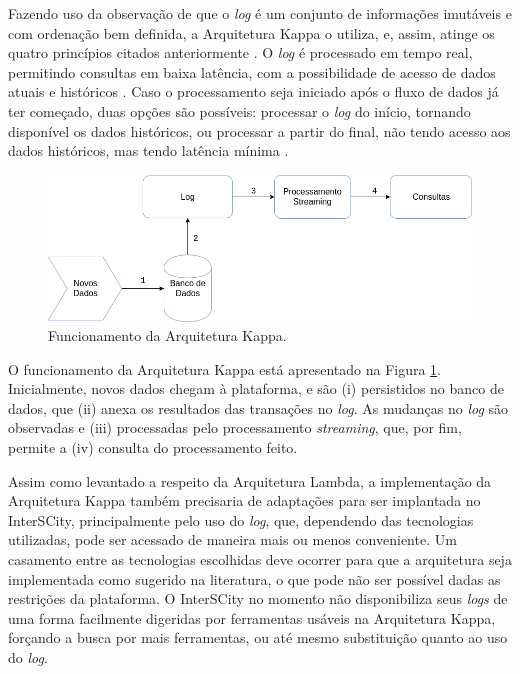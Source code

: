 Fazendo uso da observação de que o \textit{log} é um conjunto de informações
imutáveis e com ordenação bem definida, a Arquitetura Kappa o utiliza, e,
assim, atinge os quatro princípios citados anteriormente \cite{kreps2014}. O
\textit{log} é processado em tempo real, permitindo consultas em baixa
latência, com a possibilidade de acesso de dados atuais e históricos
\cite{forgeat2015}. Caso o processamento seja iniciado após o fluxo de dados já
ter começado, duas opções são possíveis: processar o \textit{log} do início,
tornando disponível os dados históricos, ou processar a partir do final,
não tendo acesso aos dados históricos, mas tendo latência mínima
\cite{kreps2014}.

\begin{figure}
  \centering
    \includegraphics[scale=0.5]{figuras/kappa_architecture.png}
  \caption{Funcionamento da Arquitetura Kappa.}
  \label{fig:kappa-lifecycle}
\end{figure}

O funcionamento da Arquitetura Kappa está apresentado na Figura
\ref{fig:kappa-lifecycle}. Inicialmente, novos dados chegam à plataforma, e são
(i) persistidos no banco de dados, que (ii) anexa os resultados das transações
no \textit{log}. As mudanças no \textit{log} são observadas e
(iii) processadas pelo processamento \textit{streaming}, que, por fim, permite
a (iv) consulta do processamento feito.

Assim como levantado a respeito da Arquitetura Lambda, a implementação da
Arquitetura Kappa também precisaria de adaptações para ser implantada no
InterSCity, principalmente pelo uso do \textit{log}, que, dependendo das
tecnologias utilizadas, pode ser acessado de maneira mais ou menos conveniente.
Um casamento entre as tecnologias escolhidas deve ocorrer para que a
arquitetura seja implementada como sugerido na literatura, o que pode não ser
possível dadas as restrições da plataforma. O InterSCity no momento não
disponibiliza seus \textit{logs} de uma forma facilmente digeridas por
ferramentas usáveis na Arquitetura Kappa, forçando a busca por mais ferramentas,
ou até mesmo substituição quanto ao uso do \textit{log}.

